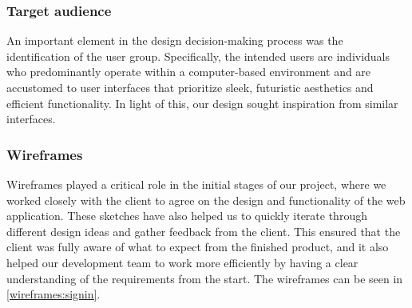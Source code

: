 \subsubsection{Target audience}
An important element in the design decision-making process was the identification of the user group. Specifically, the intended users are individuals who predominantly operate within a computer-based environment and are accustomed to user interfaces that prioritize sleek, futuristic aesthetics and efficient functionality. In light of this, our design sought inspiration from similar interfaces.


\subsubsection{Wireframes}

Wireframes played a critical role in the initial stages of our project, where we worked closely with the client to agree on the design and functionality of the web application. These sketches have also helped us to quickly iterate through different design ideas and gather feedback from the client. This ensured that the client was fully aware of what to expect from the finished product, and it also helped our development team to work more efficiently by having a clear understanding of the requirements from the start. The wireframes can be seen in \autoref{wireframes:signin}.





